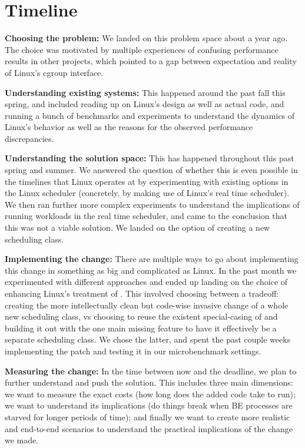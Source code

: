 
\section{Timeline}
\label{sec:timeline}

\textbf{Choosing the problem:} We landed on this problem space about a year ago.
The choice was motivated by multiple experiences of confusing performance
results in other projects, which pointed to a gap between expectation and
reality of Linux's cgroup interface.

\textbf{Understanding existing systems:} This happened around the past fall this
spring, and included reading up on Linux's design as well as actual code, and
running a bunch of benchmarks and experiments to understand the dynamics of
Linux's behavior as well as the reasons for the observed performance
discrepancies.

\textbf{Understanding the solution space:} This has happened throughout this
past spring and summer. We answered the question of whether this is even
possible in the timelines that Linux operates at by experimenting with existing
options in the Linux scheduler (concretely, by making use of Linux's real time
scheduler). We then ran further more complex experiments to understand the
implications of running workloads in the real time scheduler, and came to the
conclusion that this was not a viable solution. We landed on the option of
creating a new scheduling class. 

\textbf{Implementing the change:} There are multiple ways to go about
implementing this change in something as big and complicated as Linux. In the
past month we experimented with different approaches and ended up landing on the
choice of enhancing Linux's treatment of \schedidle{}. This involved choosing
between a tradeoff: creating the more intellectually clean but code-wise
invasive change of a whole new scheduling class, vs choosing to reuse the
existent special-casing of \schedidle{} and building it out with the one main
missing feature to have it effectively be a separate scheduling class. We chose
the latter, and spent the past couple weeks implementing the patch and testing
it in our microbenchmark settings. 


\textbf{Measuring the change:} In the time between now and the deadline, we plan
to further understand and push the solution. This includes three main
dimensions: we want to measure the exact costs (how long does the added code
take to run); we want to understand its implications (do things break when BE
processes are starved for longer periods of time); and finally we want to create
more realistic and end-to-end scenarios to understand the practical implications
of the change we made.


